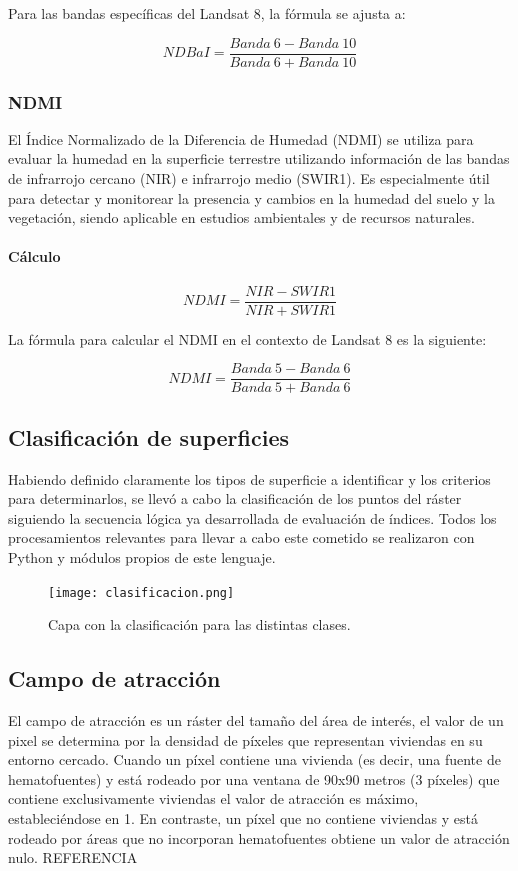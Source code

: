 Para las bandas específicas del Landsat 8, la fórmula se ajusta a:

$$NDBaI=\frac{Banda~6-Banda~10}{Banda~6+Banda~10}$$

\subsubsection{NDMI}

El Índice Normalizado de la Diferencia de Humedad (NDMI) se utiliza para evaluar la humedad en la superficie terrestre utilizando información de las bandas de infrarrojo cercano (NIR) e infrarrojo medio (SWIR1). Es especialmente útil para detectar y monitorear la presencia y cambios en la humedad del suelo y la vegetación, siendo aplicable en estudios ambientales y de recursos naturales.

\paragraph{Cálculo}

$$NDMI=\frac{NIR-SWIR1}{NIR+SWIR1}$$

La fórmula para calcular el NDMI en el contexto de Landsat 8 es la siguiente:

$$NDMI=\frac{Banda~5-Banda~6}{Banda~5+Banda~6}$$

\subsection{Clasificación de superficies}

Habiendo definido claramente los tipos de superficie a identificar y los criterios para determinarlos, se llevó a cabo la clasificación de los puntos del ráster siguiendo la secuencia lógica ya desarrollada de evaluación de índices. Todos los procesamientos relevantes para llevar a cabo este cometido se realizaron con Python y módulos propios de este lenguaje.

\begin{figure}[H]
	\texttt{[image: clasificacion.png]}
	\centering
	\caption{Capa con la clasificación para las distintas clases.}
	\label{fig:clasificacion}
\end{figure}

\subsection{Campo de atracción} \label{campo-de-atraccion}

El campo de atracción es un ráster del tamaño del área de interés, el valor de un pixel se determina por la densidad de píxeles que representan viviendas en su entorno cercado. Cuando un píxel contiene una vivienda (es decir, una fuente de hematofuentes) y está rodeado por una ventana de 90x90 metros (3 píxeles) que contiene exclusivamente viviendas el valor de atracción es máximo, estableciéndose en 1. En contraste, un píxel que no contiene viviendas y está rodeado por áreas que no incorporan hematofuentes obtiene un valor de atracción nulo. REFERENCIA

